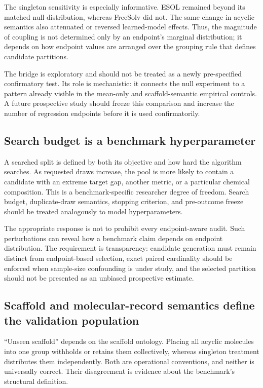 The singleton sensitivity is especially informative. ESOL remained beyond its matched null distribution, whereas FreeSolv did not. The same change in acyclic semantics also attenuated or reversed learned-model effects. Thus, the magnitude of coupling is not determined only by an endpoint's marginal distribution; it depends on how endpoint values are arranged over the grouping rule that defines candidate partitions.

The bridge is exploratory and should not be treated as a newly pre-specified confirmatory test. Its role is mechanistic: it connects the null experiment to a pattern already visible in the mean-only and scaffold-semantic empirical controls. A future prospective study should freeze this comparison and increase the number of regression endpoints before it is used confirmatorily.

\subsection{Search budget is a benchmark hyperparameter}

A searched split is defined by both its objective and how hard the algorithm searches. As requested draws increase, the pool is more likely to contain a candidate with an extreme target gap, another metric, or a particular chemical composition. This is a benchmark-specific researcher degree of freedom. Search budget, duplicate-draw semantics, stopping criterion, and pre-outcome freeze should be treated analogously to model hyperparameters.

The appropriate response is not to prohibit every endpoint-aware audit. Such perturbations can reveal how a benchmark claim depends on endpoint distribution. The requirement is transparency: candidate generation must remain distinct from endpoint-based selection, exact paired cardinality should be enforced when sample-size confounding is under study, and the selected partition should not be presented as an unbiased prospective estimate.

\subsection{Scaffold and molecular-record semantics define the validation population}

``Unseen scaffold'' depends on the scaffold ontology. Placing all acyclic molecules into one group withholds or retains them collectively, whereas singleton treatment distributes them independently. Both are operational conventions, and neither is universally correct. Their disagreement is evidence about the benchmark's structural definition.

